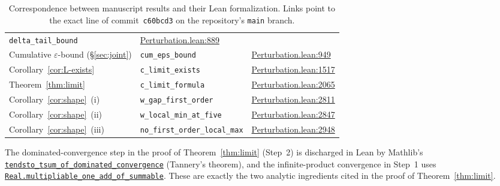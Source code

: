 \documentclass[12pt]{article}
\theoremstyle{definition}
\theoremstyle{remark}
\begin{document}
\begin{table}[h]
\begin{tabular}{@{}lll@{}}
  \texttt{delta\_tail\_bound} &
  \href{https://github.com/pfaffelh/coins/blob/c60bcd3/CoinsLean/CoinsLean/Perturbation.lean\#L889}{Perturbation.lean:889} \\
Cumulative $\varepsilon$-bound (\S\ref{sec:joint}) &
  \texttt{cum\_eps\_bound} &
  \href{https://github.com/pfaffelh/coins/blob/c60bcd3/CoinsLean/CoinsLean/Perturbation.lean\#L949}{Perturbation.lean:949} \\
Corollary~\ref{cor:L-exists} &
  \texttt{c\_limit\_exists} &
  \href{https://github.com/pfaffelh/coins/blob/c60bcd3/CoinsLean/CoinsLean/Perturbation.lean\#L1517}{Perturbation.lean:1517} \\
Theorem~\ref{thm:limit} &
  \texttt{c\_limit\_formula} &
  \href{https://github.com/pfaffelh/coins/blob/c60bcd3/CoinsLean/CoinsLean/Perturbation.lean\#L2065}{Perturbation.lean:2065} \\
Corollary~\ref{cor:shape}~(i) &
  \texttt{w\_gap\_first\_order} &
  \href{https://github.com/pfaffelh/coins/blob/c60bcd3/CoinsLean/CoinsLean/Perturbation.lean\#L2811}{Perturbation.lean:2811} \\
Corollary~\ref{cor:shape}~(ii) &
  \texttt{w\_local\_min\_at\_five} &
  \href{https://github.com/pfaffelh/coins/blob/c60bcd3/CoinsLean/CoinsLean/Perturbation.lean\#L2847}{Perturbation.lean:2847} \\
Corollary~\ref{cor:shape}~(iii) &
  \texttt{no\_first\_order\_local\_max} &
  \href{https://github.com/pfaffelh/coins/blob/c60bcd3/CoinsLean/CoinsLean/Perturbation.lean\#L2948}{Perturbation.lean:2948} \\
\hline
\end{tabular}
\caption{Correspondence between manuscript results and their Lean
  formalization.  Links point to the exact line of
  commit~\texttt{c60bcd3} on the repository's
  \texttt{main} branch.}\label{tab:lean-map}
\end{table}

The dominated-convergence step in the proof of
Theorem~\ref{thm:limit} (Step~2) is discharged in Lean by
Mathlib's \href{https://leanprover-community.github.io/mathlib4_docs/Mathlib/Analysis/Normed/Group/Tannery.html}{\texttt{tendsto\_tsum\_of\_dominated\_convergence}}
(Tannery's theorem), and the infinite-product convergence in
Step~1 uses
\href{https://leanprover-community.github.io/mathlib4_docs/Mathlib/Analysis/SpecificLimits/Normed.html}{\texttt{Real.multipliable\_one\_add\_of\_summable}}.
These are exactly the two analytic ingredients cited in the proof
of Theorem~\ref{thm:limit}.
\end{document}
